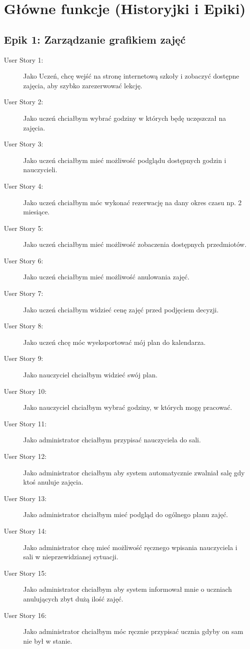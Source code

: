 \documentclass[12pt,a4paper]{article}
\begin{document}
\section{Główne funkcje (Historyjki i Epiki)}

\subsection{Epik 1: Zarządzanie grafikiem zajęć}
\begin{description}
    \item[User Story 1:] Jako Uczeń, chcę wejść na stronę internetową szkoły i zobaczyć dostępne zajęcia, aby szybko zarezerwować lekcję.
    \item[User Story 2:] Jako uczeń chciałbym wybrać godziny w których będę uczęszczał na zajęcia.
    \item[User Story 3:] Jako uczeń chciałbym mieć możliwość podglądu dostępnych godzin i nauczycieli.
    \item[User Story 4:] Jako uczeń chciałbym móc wykonać rezerwację na dany okres czasu np. 2 miesiące.
    \item[User Story 5:] Jako uczeń chciałbym mieć możliwość zobaczenia dostępnych przedmiotów.
    \item[User Story 6:] Jako uczeń chciałbym mieć możliwość anulowania zajęć.
    \item[User Story 7:] Jako uczeń chciałbym widzieć cenę zajęć przed podjęciem decyzji.
    \item[User Story 8:] Jako uczeń chcę móc wyeksportować mój plan do kalendarza.
    \item[User Story 9:] Jako nauczyciel chciałbym widzieć swój plan.
    \item[User Story 10:] Jako nauczyciel chciałbym wybrać godziny, w których mogę pracować.
    \item[User Story 11:] Jako administrator chciałbym przypisać nauczyciela do sali.
    \item[User Story 12:] Jako administrator chciałbym aby system automatycznie zwalniał salę gdy ktoś anuluje zajęcia.
    \item[User Story 13:] Jako administrator chciałbym mieć podgląd do ogólnego planu zajęć.
    \item[User Story 14:] Jako administrator chcę mieć możliwość ręcznego wpisania nauczyciela i sali w nieprzewidzianej sytuacji.
    \item[User Story 15:] Jako administrator chciałbym aby system informował mnie o uczniach anulujących zbyt dużą ilość zajęć.
    \item[User Story 16:] Jako administrator chciałbym móc ręcznie przypisać ucznia gdyby on sam nie był w stanie.
\end{description}
\end{document}
